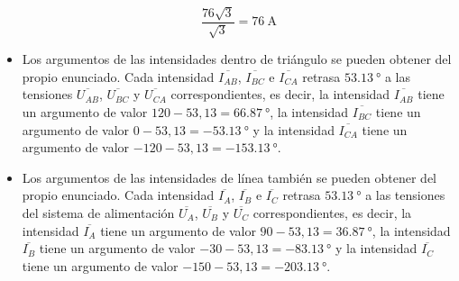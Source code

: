 \documentclass[a4paper,11pt]{article}
\begin{document}
\begin{itemize}
    \[
    \dfrac{76\sqrt{3}}{\sqrt{3}}=\SI{76}{\ampere}
    \]
    \item 	Los argumentos de las intensidades dentro de triángulo se pueden obtener del propio enunciado. Cada intensidad $\overline{I_{AB}}$, $\overline{I_{BC}}$ e $\overline{I_{CA}}$ retrasa $\SI{53,13}{\degree}$ a las tensiones $\overline{U_{AB}}$, $\overline{U_{BC}}$ y $\overline{U_{CA}}$ correspondientes, es decir, la intensidad $\overline{I_{AB}}$ tiene un argumento de valor $120-53,13=\SI{66,87}{\degree}$, la intensidad $\overline{I_{BC}}$ tiene un argumento de valor $0-53,13=\SI{-53,13}{\degree}$ y la intensidad $\overline{I_{CA}}$ tiene un argumento de valor $-120-53,13=\SI{-153,13}{\degree}$.
    \item 	Los argumentos de las intensidades de línea también se pueden obtener del propio enunciado. Cada intensidad $\overline{I_A}$, $\overline{I_B}$ e $\overline{I_C}$ retrasa $\SI{53,13}{\degree}$ a las tensiones del sistema de alimentación $\overline{U_A}$, $\overline{U_B}$ y $\overline{U_C}$ correspondientes, es decir, la intensidad $\overline{I_A}$ tiene un argumento de valor $90-53,13=\SI{36,87}{\degree}$, la intensidad $\overline{I_B}$ tiene un argumento de valor $-30-53,13=\SI{-83,13}{\degree}$ y la intensidad $\overline{I_C}$ tiene un argumento de valor $-150-53,13=\SI{-203,13}{\degree}$.
\end{itemize}
\end{document}
